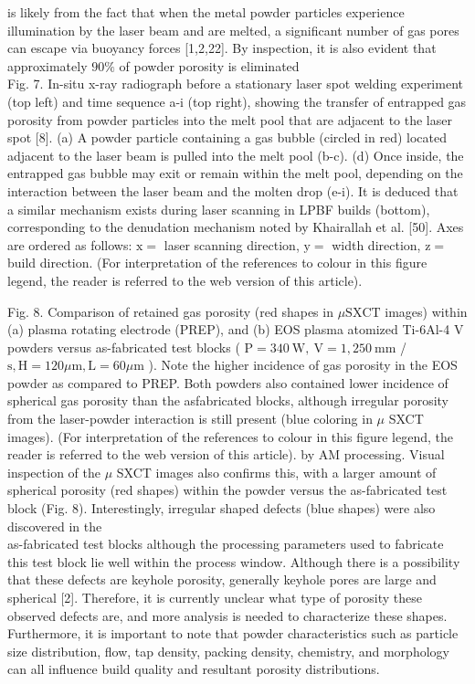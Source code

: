 \documentclass[10pt]{article}
\begin{document}
is likely from the fact that when the metal powder particles experience illumination by the laser beam and are melted, a significant number of gas pores can escape via buoyancy forces [1,2,22]. By inspection, it is also evident that approximately $90 \%$ of powder porosity is eliminated\\
Fig. 7. In-situ x-ray radiograph before a stationary laser spot welding experiment (top left) and time sequence a-i (top right), showing the transfer of entrapped gas porosity from powder particles into the melt pool that are adjacent to the laser spot [8]. (a) A powder particle containing a gas bubble (circled in red) located adjacent to the laser beam is pulled into the melt pool (b-c). (d) Once inside, the entrapped gas bubble may exit or remain within the melt pool, depending on the interaction between the laser beam and the molten drop (e-i). It is deduced that a similar mechanism exists during laser scanning in LPBF builds (bottom), corresponding to the denudation mechanism noted by Khairallah et al. [50]. Axes are ordered as follows: $\mathrm{x}=$ laser scanning direction, $\mathrm{y}=$ width direction, $\mathrm{z}=$ build direction. (For interpretation of the references to colour in this figure legend, the reader is referred to the web version of this article).

Fig. 8. Comparison of retained gas porosity (red shapes in $\mu \mathrm{SXCT}$ images) within (a) plasma rotating electrode (PREP), and (b) EOS plasma atomized Ti-6Al-4 V powders versus as-fabricated test blocks ( $\mathrm{P}=340 \mathrm{~W}, \mathrm{~V}=1,250 \mathrm{~mm}$ / $\mathrm{s}, \mathrm{H}=120 \mu \mathrm{m}, \mathrm{L}=60 \mu \mathrm{m}$ ). Note the higher incidence of gas porosity in the EOS powder as compared to PREP. Both powders also contained lower incidence of spherical gas porosity than the asfabricated blocks, although irregular porosity from the laser-powder interaction is still present (blue coloring in $\mu$ SXCT images). (For interpretation of the references to colour in this figure legend, the reader is referred to the web version of this article). by AM processing. Visual inspection of the $\mu$ SXCT images also confirms this, with a larger amount of spherical porosity (red shapes) within the powder versus the as-fabricated test block (Fig. 8). Interestingly, irregular shaped defects (blue shapes) were also discovered in the\\
as-fabricated test blocks although the processing parameters used to fabricate this test block lie well within the process window. Although there is a possibility that these defects are keyhole porosity, generally keyhole pores are large and spherical [2]. Therefore, it is currently unclear what type of porosity these observed defects are, and more analysis is needed to characterize these shapes. Furthermore, it is important to note that powder characteristics such as particle size distribution, flow, tap density, packing density, chemistry, and morphology can all influence build quality and resultant porosity distributions.
\end{document}
